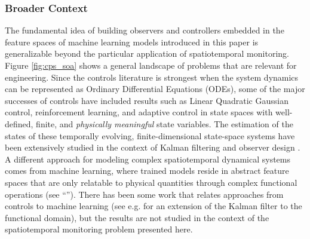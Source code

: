\subsubsection*{Broader Context}
The fundamental idea of building observers and controllers embedded in the feature spaces of machine learning models introduced in this paper is generalizable beyond the particular application of spatiotemporal monitoring. Figure \ref{fig:cps_soa} shows a general landscape of problems that are relevant for engineering. Since the controls literature is strongest when the system dynamics can be represented as Ordinary Differential Equations (ODEs), some of the major successes of controls have included results such as Linear Quadratic Gaussian control, reinforcement learning, and adaptive control in state spaces with well-defined, finite, and \emph{physically meaningful} state variables. The estimation of the states of these temporally evolving, finite-dimensional state-space systems have been extensively studied in the context of Kalman filtering and observer design \cite{Gelb74}. A different approach for modeling complex spatiotemporal dynamical systems comes from machine learning, where trained models reside in abstract feature spaces that are only relatable to physical quantities through complex functional operations (see ``''). There has been some work that relates approaches from controls to machine learning (see e.g. \cite{mardia1998kriged} for an extension of the Kalman filter to the functional domain), but the results are not studied in the context of the spatiotemporal monitoring problem presented here. 

